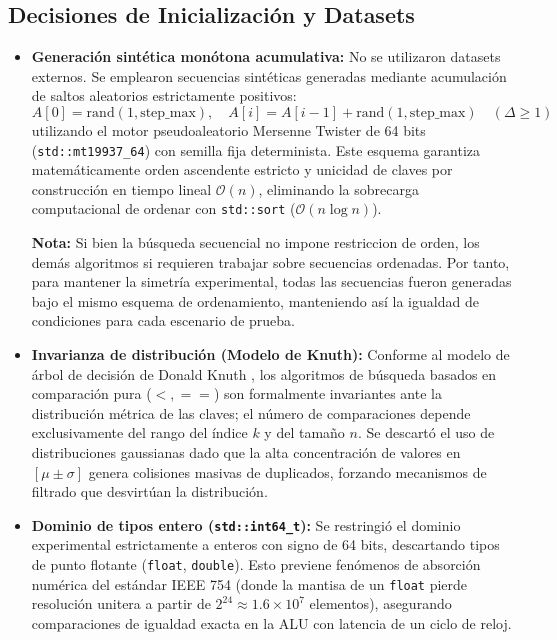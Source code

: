 \documentclass[11pt,letterpaper]{article}
\begin{document}
\subsection{Decisiones de Inicialización y Datasets}
\begin{itemize}
    \item \textbf{Generación sintética monótona acumulativa:} No se utilizaron datasets externos. Se emplearon secuencias sintéticas generadas mediante acumulación de saltos aleatorios estrictamente positivos:
    \begin{equation}
        A[0] = \text{rand}(1, \text{step\_max}), \quad A[i] = A[i-1] + \text{rand}(1, \text{step\_max}) \quad (\Delta \ge 1)
    \end{equation}
    utilizando el motor pseudoaleatorio Mersenne Twister de 64 bits (\texttt{std::mt19937\_64}) con semilla fija determinista. Este esquema garantiza matemáticamente orden ascendente estricto y unicidad de claves por construcción en tiempo lineal $\mathcal{O}(n)$, eliminando la sobrecarga computacional de ordenar con \texttt{std::sort} ($\mathcal{O}(n \log n)$).

    \textbf{Nota:} Si bien la búsqueda secuencial no impone restriccion de orden, los demás algoritmos si requieren trabajar sobre secuencias ordenadas. Por tanto, para mantener la simetría experimental, todas las secuencias fueron generadas bajo el mismo esquema de ordenamiento, manteniendo así la igualdad de condiciones para cada escenario de prueba. 
    
    \item \textbf{Invarianza de distribución (Modelo de Knuth):} Conforme al modelo de árbol de decisión de Donald Knuth \cite{demaine2020}, los algoritmos de búsqueda basados en comparación pura ($<, ==$) son formalmente invariantes ante la distribución métrica de las claves; el número de comparaciones depende exclusivamente del rango del índice $k$ y del tamaño $n$. Se descartó el uso de distribuciones gaussianas dado que la alta concentración de valores en $[\mu \pm \sigma]$ genera colisiones masivas de duplicados, forzando mecanismos de filtrado que desvirtúan la distribución.
    
    \item \textbf{Dominio de tipos entero (\texttt{std::int64\_t}):} Se restringió el dominio experimental estrictamente a enteros con signo de 64 bits, descartando tipos de punto flotante (\texttt{float}, \texttt{double}). Esto previene fenómenos de absorción numérica del estándar IEEE 754 (donde la mantisa de un \texttt{float} pierde resolución unitera a partir de $2^{24} \approx 1.6 \times 10^7$ elementos), asegurando comparaciones de igualdad exacta en la ALU con latencia de un ciclo de reloj.
    

\end{itemize}
\end{document}
